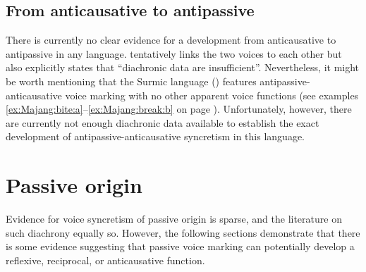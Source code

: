\subsection{From anticausative to antipassive} \label{diachrony:antc2antp}
There is currently no clear evidence for a development from anticausative to antipassive in any language. \citet[225]{haspelmath:2003} tentatively links the two voices to each other but also explicitly states that “diachronic data are insufficient”. Nevertheless, it might be worth mentioning that the Surmic language  () features antipassive-anticausative voice marking with no other apparent voice functions (see examples \ref{ex:Majang:bite:a}--\ref{ex:Majang:break:b} on page \pageref{ex:Majang:bite:a}). Unfortunately, however, there are currently not enough diachronic data available to establish the exact development of antipassive-anticausative syncretism in this language. 

\section{Passive origin} \label{diachrony:passive}
Evidence for voice syncretism of passive origin is sparse, and the literature on such diachrony equally so. However, the following sections demonstrate that there is some evidence suggesting that passive voice marking can potentially develop a reflexive, reciprocal, or anticausative function.

